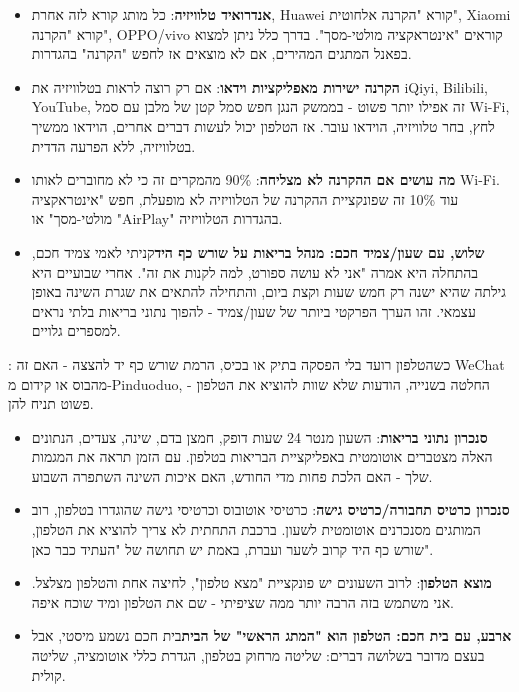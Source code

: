 \begin{itemize}
  \item \textbf{אנדרואיד טלוויזיה}: כל מותג קורא לזה אחרת, Huawei קורא "הקרנה אלחוטית", Xiaomi קורא "הקרנה", OPPO/vivo קוראים "אינטראקציה מולטי-מסך". בדרך כלל ניתן למצוא בפאנל המתגים המהירים, אם לא מוצאים אז לחפש "הקרנה" בהגדרות.
  \item \textbf{הקרנה ישירות מאפליקציות וידאו}: אם רק רוצה לראות בטלוויזיה את iQiyi, Bilibili, YouTube, זה אפילו יותר פשוט - בממשק הנגן חפש סמל קטן של מלבן עם סמל Wi-Fi, לחץ, בחר טלוויזיה, הוידאו עובר. אז הטלפון יכול לעשות דברים אחרים, הוידאו ממשיך בטלוויזיה, ללא הפרעה הדדית.
  \item \textbf{מה עושים אם ההקרנה לא מצליחה}: 90\% מהמקרים זה כי לא מחוברים לאותו Wi-Fi. עוד 10\% זה שפונקציית ההקרנה של הטלוויזיה לא מופעלת, חפש "אינטראקציה מולטי-מסך" או "AirPlay" בהגדרות הטלוויזיה.
  \item \textbf{שלוש, עם שעון/צמיד חכם: מנהל בריאות על שורש כף היד}קניתי לאמי צמיד חכם, בהתחלה היא אמרה "אני לא עושה ספורט, למה לקנות את זה". אחרי שבועיים היא גילתה שהיא ישנה רק חמש שעות וקצת ביום, והתחילה להתאים את שגרת השינה באופן עצמאי. זהו הערך הפרקטי ביותר של שעון/צמיד - להפוך נתוני בריאות בלתי נראים למספרים גלויים.
\end{itemize}


: כשהטלפון רועד בלי הפסקה בתיק או בכיס, הרמת שורש כף יד להצצה - האם זה WeChat מהבוס או קידום מ-Pinduoduo, החלטה בשנייה, הודעות שלא שוות להוציא את הטלפון - פשוט תניח להן.

\begin{itemize}
  \item \textbf{סנכרון נתוני בריאות}: השעון מנטר 24 שעות דופק, חמצן בדם, שינה, צעדים, הנתונים האלה מצטברים אוטומטית באפליקציית הבריאות בטלפון. עם הזמן תראה את המגמות שלך - האם הלכת פחות מדי החודש, האם איכות השינה השתפרה השבוע.
  \item \textbf{סנכרון כרטיס תחבורה/כרטיס גישה}: כרטיסי אוטובוס וכרטיסי גישה שהוגדרו בטלפון, רוב המותגים מסנכרנים אוטומטית לשעון. ברכבת התחתית לא צריך להוציא את הטלפון, שורש כף היד קרוב לשער ועברת, באמת יש תחושה של "העתיד כבר כאן".
  \item \textbf{מוצא הטלפון}: לרוב השעונים יש פונקציית "מצא טלפון", לחיצה אחת והטלפון מצלצל. אני משתמש בזה הרבה יותר ממה שציפיתי - שם את הטלפון ומיד שוכח איפה.
  \item \textbf{ארבע, עם בית חכם: הטלפון הוא "המתג הראשי" של הבית}בית חכם נשמע מיסטי, אבל בעצם מדובר בשלושה דברים: שליטה מרחוק בטלפון, הגדרת כללי אוטומציה, שליטה קולית.
\end{itemize}

